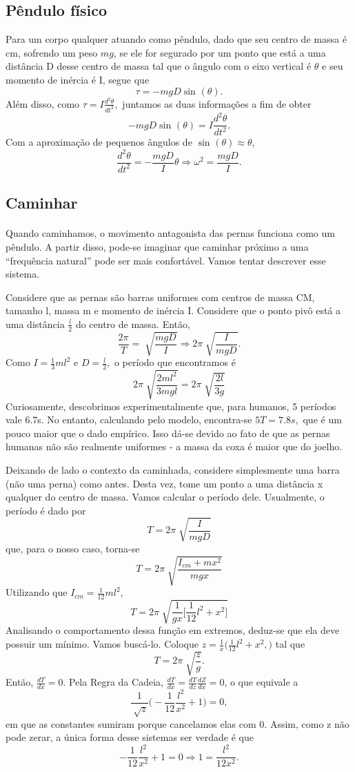 \documentclass[PhysicsII/physicsII_notes.tex]{subfiles}
\begin{document}
\subsection{Pêndulo físico}
Para um corpo qualquer atuando como pêndulo, dado que seu centro de massa é cm, sofrendo um peso \(mg\), se ele for segurado por um ponto que está a uma distância
D desse centro de massa tal que o ângulo com o eixo vertical é \(\theta \) e seu momento de inércia é I, segue que
\[
	\tau  = -mgD\sin^{}{(\theta )}.
\]
Além disso, como \(\tau = I \frac{d^{2}\theta }{dt^{2}},\) juntamos as duas informações a fim de obter
\[
	-mgD\sin^{}{(\theta )} = I \frac{d^{2}\theta }{dt^{2}}.
\]
Com a aproximação de pequenos ângulos de \(\sin^{}{(\theta )}\approx \theta \),
\[
	\frac{d^{2}\theta }{dt^{2}} = -\frac{mgD}{I}\theta \Rightarrow \omega^{2}= \frac{mgD}{I}.
\]
\subsection{Caminhar}
\paragraph{} Quando caminhamos, o movimento antagonista das pernas funciona como um pêndulo. A partir disso, pode-se imaginar que caminhar próximo
a uma ``frequência natural'' pode ser mais confortável. Vamos tentar descrever esse sistema.

Considere que as pernas são barras uniformes com centros de massa CM, tamanho l, massa m e momento de inércia I. Considere
que o ponto pivô está a uma distância \(\frac{l}{2}\) do centro de massa. Então,
\[
	\frac{2\pi }{T} = \sqrt[]{\frac{mgD}{I}} \Rightarrow 2\pi \sqrt[]{\frac{I}{mgD}}.
\]
Como \(I = \frac{1}{3}ml^{2}\) e \(D = \frac{l}{2},\) o período que encontramos é
\[
	2\pi \sqrt[]{\frac{2ml^{2}}{3mgl}} = 2\pi \sqrt[]{\frac{2l}{3g}}
\]
Curiosamente, descobrimos experimentalmente que, para humanos, 5 períodos vale 6.7s. No entanto,
calculando pelo modelo, encontra-se \(5T=7.8s,\) que é um pouco maior que o dado empírico. Isso dá-se
devido ao fato de que as pernas humanas não são realmente uniformes - a massa da coxa é maior que do joelho.

Deixando de lado o contexto da caminhada, considere simplesmente uma barra (não uma perna) como antes. Desta vez,
tome um ponto a uma distância x qualquer do centro de massa. Vamos calcular o período dele.
Usualmente, o período é dado por
\[
	T = 2\pi \sqrt[]{\frac{I}{mgD}}
\]
que, para o nosso caso, torna-se
\[
	T = 2\pi \sqrt[]{\frac{I_{cm}+mx^{2}}{mgx}}
\]
Utilizando que \(I_{cm}= \frac{1}{12}ml^{2},\)
\[
	T = 2\pi \sqrt[]{\frac{1}{gx}\biggl[\frac{1}{12}l^{2}+x^{2}\biggr]}
\]
Analisando o comportamento dessa função em extremos, deduz-se que ela deve possuir um mínimo. Vamos buscá-lo.
Coloque \(z = \frac{1}{x}\biggl(\frac{1}{12}l^{2}+x^{2},\biggr)\) tal que
\[
	T = 2\pi \sqrt[]{\frac{z}{g}}.
\]
Então, \(\frac{dT}{dx}=0\). Pela Regra da Cadeia, \(\frac{dT}{dx} = \frac{dT}{dz}\frac{dZ}{dx} = 0\), o que equivale a
\[
	\frac{1}{\sqrt[]{z}}\biggl(-\frac{1}{12}\frac{l^{2}}{x^{2}}+1\biggr) = 0,
\]
em que as constantes sumiram porque cancelamos elas com 0. Assim, como z não pode zerar, a única forma desse sistemas ser verdade é que
\[
	-\frac{1}{12}\frac{l^{2}}{x^{2}}+1 = 0 \Rightarrow 1 = \frac{l^{2}}{12x^{2}}.
\]
\end{document}
